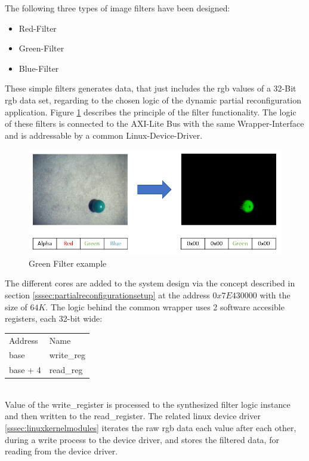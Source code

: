 The following three types of image filters have been designed:
\begin{itemize}
\item Red-Filter
\item Green-Filter
\item Blue-Filter
\end{itemize}
These simple filters generates data, that just includes the \gls{rgb} values of a 32-Bit \gls{rgb} data set, regarding to the chosen logic of the dynamic partial reconfiguration application. Figure \ref{fig:imagefilter} describes the principle of the filter functionality. The logic of these filters is connected to the AXI-Lite Bus with the same Wrapper-Interface and is addressable by a common Linux-Device-Driver.\\
\begin{figure}[h]
\centering
\includegraphics[width=1\textwidth]{sections/methodology/ImageFilter.PNG}
\caption{\label{fig:imagefilter} Green Filter example}
\end{figure}
The different cores are added to the system design via the concept described in section \ref{sssec:partialreconfigurationsetup} at the address $0x7E430000$ with the size of $64K$.  The logic behind the common wrapper uses 2 software accesible registers, each 32-bit wide:\\
\begin{tabular}{ll}
	Address & Name \\
	base     & write\_reg\\
	base + 4 & read\_reg\\
\end{tabular}\\
Value of the write_register is processed to the synthesized filter logic instance and then written to the read_register. The related linux device driver \ref{sssec:linuxkernelmodules} iterates the raw \gls{rgb} data each value after each other, during a write process to the device driver, and stores the filtered data, for reading from the device driver.
